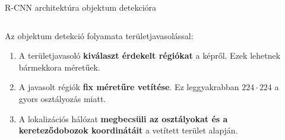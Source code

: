 \documentclass[english, aspectratio=169]{beamer}
\begin{document}
	\begin{frame}{R-CNN architektúra objektum detekcióra}
		\begin{columns}
			\begin{column}{.4\textwidth}
				Az objektum detekció folyamata területjavasolással:
				\begin{enumerate}
					\item A területjavasoló \textbf{kiválaszt érdekelt régiókat} a képről. Ezek lehetnek bármekkora méretűek.
					\item A javasolt régiók \textbf{fix méretűre vetítése}. Ez leggyakrabban $224 \cdot 224$ a gyors osztályozás miatt. 
					\item A lokalizációs hálózat \textbf{megbecsüli az osztályokat és a kereteződobozok koordinátáit} a vetített terület alapján.
				\end{enumerate}
			\end{column}
			\begin{column}{.6\textwidth}
				\begin{center}

\end{center}
\end{column}
\end{columns}
\end{frame}
\end{document}
